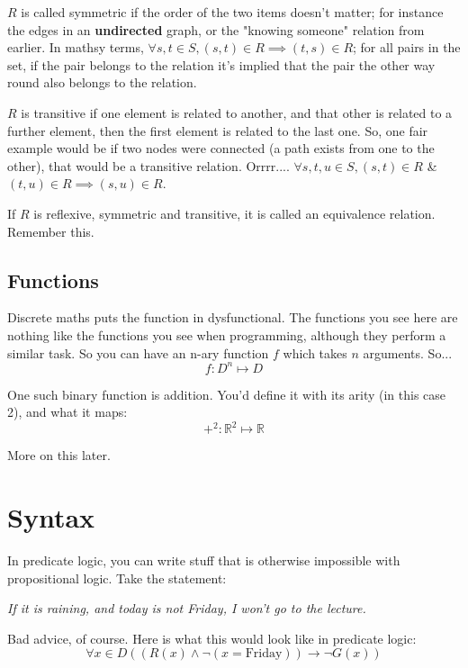$R$ is called \gls{symmetric} if the order of the two items doesn't matter; for instance the edges in an \textbf{undirected} graph, or the "knowing someone" relation from earlier. In mathsy terms, $\forall s,t \in S, (s, t) \in R \implies (t, s) \in R$; for all pairs in the set, if the pair belongs to the relation it's implied that the pair the other way round also belongs to the relation.

$R$ is \gls{transitive} if one element is related to another, and that other is related to a further element, then the first element is related to the last one. So, one fair example would be if two nodes were connected (a path exists from one to the other), that would be a transitive relation. Orrrr.... $\forall s, t, u \in S, (s, t) \in R $ \& $ (t, u) \in R \implies (s, u) \in R$.

If $R$ is reflexive, symmetric and transitive, it is called an equivalence relation. Remember this.

\subsection{Functions}
Discrete maths puts the function in dysfunctional. The functions you see here are nothing like the functions you see when programming, although they perform a similar task. So you can have an n-ary function $f$ which takes $n$ arguments. So...
\[
    f : D^n \mapsto D
\]

One such binary function is addition. You'd define it with its arity (in this case 2), and what it maps:
\[
    +^2 : \mathbb{R}^2 \mapsto \mathbb{R}
\]

More on this later.

\section{Syntax}
In predicate logic, you can write stuff that is otherwise impossible with propositional logic. Take the statement:

\begin{center}
    \textit{If it is raining, and today is not Friday, I won't go to the lecture.}
\end{center}

Bad advice, of course. Here is what this would look like in predicate logic:
\[
    \forall x \in D ((R(x) \land \neg(x = \text{Friday})) \to \neg G(x))
\]

